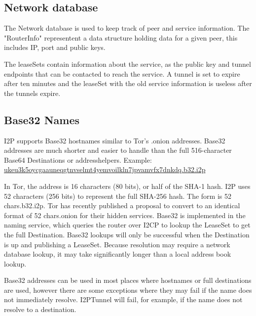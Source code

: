 \documentclass[a4paper,twocolumn,12pt]{article}
\begin{document}
\subsection{Network database}

The Network database is used to keep track of peer and service information. The "RouterInfo" representent a data structure holding data for a given peer, this includes IP, port and public keys.

The leaseSets contain information about the service, as the public key and tunnel endpoints that can be contacted to reach the service. A tunnel is set to expire after ten minutes and the leaseSet with the old service information is useless after the tunnels expire. 

\subsection{Base32 Names}

I2P supports Base32 hostnames similar to Tor's .onion addresses. Base32 addresses are much shorter and easier to handle than the full 516-character Base64 Destinations or addresshelpers. Example: 
\url{ukeu3k5oycgaauneqgtnvselmt4yemvoilkln7jpvamvfx7dnkdq.b32.i2p}

In Tor, the address is 16 characters (80 bits), or half of the SHA-1 hash.
\cite{tor-hiddenservice}
I2P uses 52 characters (256 bits) to represent the full SHA-256 hash. The form is {52 chars}.b32.i2p. Tor has recently published a proposal to convert to an identical format of {52 chars}.onion for their hidden services. Base32 is implemented in the naming service, which queries the router over I2CP to lookup the LeaseSet to get the full Destination. Base32 lookups will only be successful when the Destination is up and publishing a LeaseSet. Because resolution may require a network database lookup, it may take significantly longer than a local address book lookup.

Base32 addresses can be used in most places where hostnames or full destinations are used, however there are some exceptions where they may fail if the name does not immediately resolve. I2PTunnel will fail, for example, if the name does not resolve to a destination.




\end{document}

